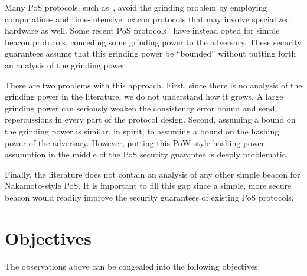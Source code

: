 Many PoS protocols, such as~\cite{Ouroboros,Etherium}, 
avoid the grinding problem 
by employing computation- and time-intensive 
beacon protocols that may involve specialized hardware as well. 
Some recent PoS protocols~\cite{Praos,SnowWhite}  
have instead opted for simple beacon protocols, 
conceding some grinding power to the adversary.
These security guarantees assume that this grinding power be ``bounded'' 
without putting forth an analysis of the grinding power.

There are two problems with this approach.
First, since there is no analysis of the grinding power in the literature, 
we do not understand how it grows. 
A large grinding power can seriously weaken the consistency error bound and 
send repercussions in every part of the protocol design. 
Second, 
assuming a bound on the grinding power is similar, in spirit, to 
assuming a bound on the hashing power of the adversary. 
However, putting this PoW-style hashing-power assumption 
in the middle of the PoS security guarantee 
is deeply problematic.

Finally, the literature does not contain an analysis of 
any other simple beacon for Nakamoto-style PoS. 
It is important to fill this gap 
since a simple, more secure beacon 
would readily improve the security guarantees of existing PoS protocols.













\section{Objectives}\label{sec:intro-objectives}
The observations above can be congealed into the following objectives:

